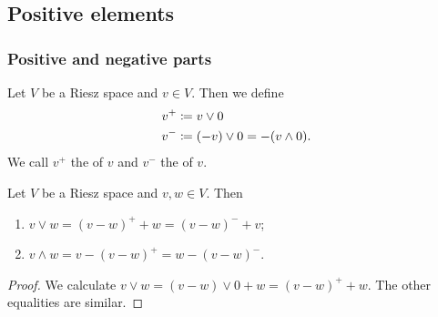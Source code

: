 \subsection{Positive elements}
\subsubsection{Positive and negative parts}
\begin{definition}
Let $V$ be a Riesz space and $v\in V$. Then we define
\begin{align*}
v^+ &\coloneqq v \vee 0 \\
v^- &\coloneqq (-v) \vee 0 = - (v \wedge 0).
\end{align*}
We call $v^+$ the  of $v$ and $v^-$ the  of $v$.
\end{definition}

\begin{lemma} \label{MeetJoinAsPositiveNegative}
Let $V$ be a Riesz space and $v,w\in V$. Then
\begin{enumerate}
\item $v\vee w = (v-w)^+ + w = (v-w)^- + v$;
\item $v\wedge w = v - (v-w)^+ = w - (v-w)^-$.
\end{enumerate}
\end{lemma}
\begin{proof}
We calculate $v\vee w = (v-w)\vee 0 + w = (v-w)^+ + w$. The other equalities are similar.
\end{proof}

